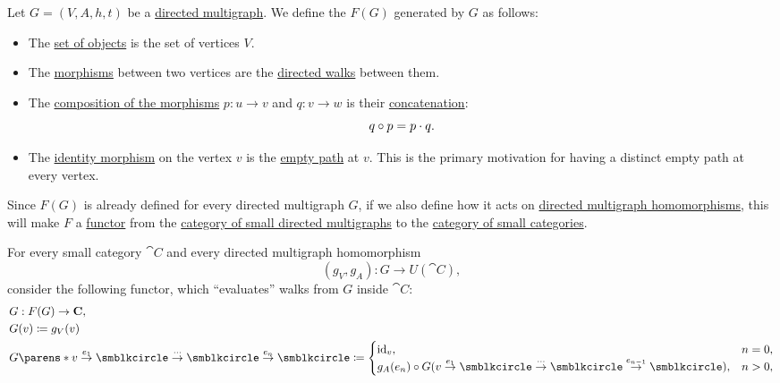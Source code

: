 \begin{definition}\label{def:directed_multigraph_free_category}
  Let \( G = (V, A, h, t) \) be a \hyperref[def:directed_multigraph]{directed multigraph}. We define the  \( F(G) \) generated by \( G \) as follows:
  \begin{itemize}
    \item The \hyperref[def:category/objects]{set of objects} is the set of vertices \( V \).

    \item The \hyperref[def:category/morphisms]{morphisms} between two vertices are the \hyperref[def:graph_walk/directed]{directed walks} between them.

    \item The \hyperref[def:category/composition]{composition of the morphisms} \( p: u \to v \) and \( q: v \to w \) is their \hyperref[def:graph_walk/concatenation]{concatenation}:
    \begin{equation*}
      q \bincirc p = p \cdot q.
    \end{equation*}

    \item The \hyperref[def:category/identity]{identity morphism} on the vertex \( v \) is the \hyperref[def:graph_walk/empty]{empty path} at \( v \). This is the primary motivation for having a distinct empty path at every vertex.
  \end{itemize}

  Since \( F(G) \) is already defined for every directed multigraph \( G \), if we also define how it acts on \hyperref[def:directed_multigraph/homomorphism]{directed multigraph homomorphisms}, this will make \( F \) a \hyperref[def:functor]{functor} from the \hyperref[def:directed_multigraph/category]{category of small directed multigraphs} to the \hyperref[def:directed_multigraph/category]{category of small categories}.

  For every small category \( \cat{C} \) and every directed multigraph homomorphism
  \begin{equation*}
    (g_V, g_A): G \to U(\cat{C}),
  \end{equation*}
  consider the following functor, which \enquote{evaluates} walks from \( G \) inside \( \cat{C} \):
  \begin{equation}\label{eq:def:directed_multigraph_free_category/functor_from_homomorphism}
    \begin{aligned}
      &G: F(G) \to \cat{C}, \\
      &G(v) \coloneqq g_V(v) \\
      &G\parens*{ v \overset {e_1} \to \anon \overset \cdots \to \anon \overset {e_n} \to \anon } \coloneqq \begin{cases}
        \id_v,                                                                                                  &n = 0, \\
        g_A(e_n) \bincirc G(v \overset {e_1} \to \anon \overset \cdots \to \anon \overset {e_{n-1}} \to \anon), &n > 0,
      \end{cases}
    \end{aligned}
  \end{equation}


\end{definition}
